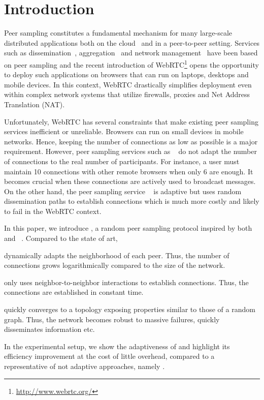 
\section{Introduction}

Peer sampling constitutes a fundamental mechanism for many large-scale
distributed applications both on the
cloud~\cite{decandia2007dynamo} and in a peer-to-peer
setting. Services such as dissemination~\cite{eugster2003lightweight,
  tolgyeski2009adaptive}, aggregation~\cite{jelasity2004epidemic} and
network management~\cite{jelasity2009tman, voulgaris2005epidemic} have
been based on peer sampling and the recent introduction of
WebRTC\footnote{\url{http://www.webrtc.org/}} opens the opportunity to
deploy such applications on browsers that can run on laptops, desktops
and mobile devices. In this context, WebRTC drastically simplifies
deployment even within complex network systems that utilize firewalls,
proxies and Net Address Translation (NAT).

Unfortunately, WebRTC has several constraints that make existing peer sampling
services inefficient or unreliable. Browsers can run on small devices in
mobile networks. Hence, keeping the number of connections as low as possible is
a major requirement. However, peer sampling services such as
\CYCLON~\cite{voulgaris2005cyclon} do not adapt the number of connections to the
real number of participants. For instance, a user must maintain 10 connections
with other remote browsers when only 6 are enough. It becomes crucial when these
connections are actively used to broadcast messages. On the other hand, the peer
sampling service \SCAMP~\cite{ganesh2003peer} is adaptive but uses random
dissemination paths to establish connections which is much more costly and
likely to fail in the WebRTC context.

In this paper, we introduce \SPRAY, a random peer sampling protocol inspired by
both \SCAMP~\cite{ganesh2003peer}
and \CYCLON~\cite{voulgaris2005cyclon}. Compared to the state of art,
\begin{inparaenum}[(i)]
\item \SPRAY dynamically adapts the neighborhood of each peer. Thus, the number
  of connections grows logarithmically compared to the size of the network.
\item \SPRAY only uses neighbor-to-neighbor interactions to establish
  connections. Thus, the connections are established in constant time.
\item \SPRAY quickly converges to a topology exposing properties similar to
  those of a random graph. Thus, the network becomes robust to massive
  failures, quickly disseminates information etc.
\item In the experimental setup, we show the adaptiveness of \SPRAY and
  highlight its efficiency improvement at the cost of little overhead, compared
  to a representative of not adaptive approaches, namely \CYCLON.
\end{inparaenum}


